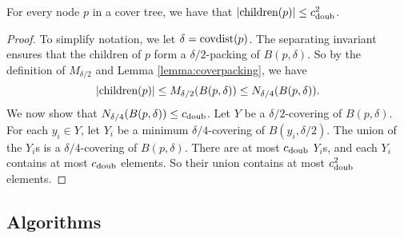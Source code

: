 \documentclass[../main.tex]{subfiles}
\newcommand{\doubnum}{c_\textnormal{doub}}
\newcommand{\p}{\ensuremath p}
\newcommand{\mkfunction}[1]{\ifmmode{\text{{#1}}}}
\newcommand{\children}[1]   {\mkfunction{children}({#1})}
\newcommand{\covdist}[1]    {\mkfunction{covdist}({#1})}
\begin{document}

\begin{lemma}
    \label{lemma:children}
    For every node $p$ in a cover tree, we have that
    $|\children\p| \le \doubnum^2$.
\end{lemma}

\begin{proof}
    To simplify notation, we let $\delta=\covdist{p}$.
    The separating invariant ensures that the children of $p$ form a $\delta/2$-packing of $B(p,\delta)$.
    So by the definition of $M_{\delta/2}$ and Lemma \ref{lemma:coverpacking}, we have
    \begin{equation}
        |\children{p}| 
        \le M_{\delta/2}(B(p,\delta)) 
        \le N_{\delta/4}(B(p,\delta)) 
        .
    \end{equation}
    We now show that $N_{\delta/4}(B(p,\delta))\le\doubnum$.
    Let $Y$ be a $\delta/2$-covering of $B(p,\delta)$.
    For each $y_i\in Y$, let $Y_i$ be a minimum $\delta/4$-covering of $B(y_i,\delta/2)$.
    The union of the $Y_i$s is a $\delta/4$-covering of $B(p,\delta)$.
    There are at most $\doubnum$ $Y_i$s, and each $Y_i$ contains at most $\doubnum$ elements.
    So their union contains at most $\doubnum^2$ elements.
\end{proof}


\subsection{Algorithms}
\end{document}
